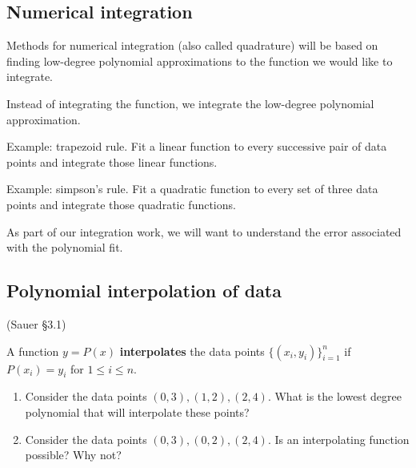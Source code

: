 \documentclass[12pt,letterpaper,noanswers]{exam}
\begin{document}
\subsection*{Numerical integration}

Methods for numerical integration (also called quadrature) will be based on finding low-degree polynomial approximations to the function we would like to integrate.

Instead of integrating the function, we integrate the low-degree polynomial approximation.

Example: trapezoid rule.  Fit a linear function to every successive pair of data points and integrate those linear functions.

Example: simpson's rule.  Fit a quadratic function to every set of three data points and integrate those quadratic functions.

As part of our integration work, we will want to understand the error associated with the polynomial fit.


\subsection*{Polynomial interpolation of data}
\begin{tcolorbox}
(Sauer \S3.1)

A function $y = P(x)$ \textbf{interpolates} the data points $\{(x_i,y_i)\}_{i=1}^n$ if $P(x_i) = y_i$ for $1\leq i\leq n$.
\end{tcolorbox}
\begin{enumerate}[resume=classQ]
\item Consider the data points $(0,3), (1,2), (2,4)$.  What is the lowest degree polynomial that will interpolate these points?
\vspace{0.6in}

\item Consider the data points $(0,3), (0,2), (2,4)$.  Is an interpolating function possible?  Why not?
\vspace{0.6in}

\end{enumerate}
\end{document}
